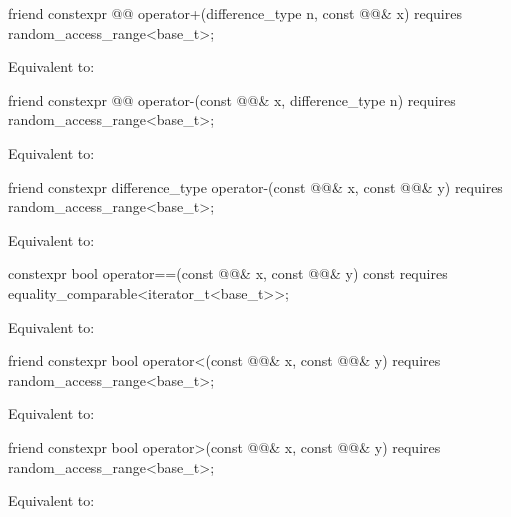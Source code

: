 \begin{itemdecl}
friend constexpr @@ operator+(difference_type n, const @@& x)
  requires random_access_range<base_t>;
\end{itemdecl}
\begin{itemdescr}
	\pnum
	\effects Equivalent to: 
\end{itemdescr}

\begin{itemdecl}
friend constexpr @@ operator-(const @@& x, difference_type n)
  requires random_access_range<base_t>;
\end{itemdecl}
\begin{itemdescr}
	\pnum
	\effects Equivalent to: 
\end{itemdescr}

\begin{itemdecl}
friend constexpr difference_type operator-(const @@& x, const @@& y)
  requires random_access_range<base_t>;
\end{itemdecl}
\begin{itemdescr}
	\pnum
	\effects Equivalent to: 
\end{itemdescr}

\begin{itemdecl}
constexpr bool operator==(const @@& x, const @@& y) const
  requires equality_comparable<iterator_t<base_t>>;
\end{itemdecl}
\begin{itemdescr}
	\pnum
	\effects Equivalent to: 
\end{itemdescr}

\begin{itemdecl}
friend constexpr bool operator<(const @@& x, const @@& y)
  requires random_access_range<base_t>;
\end{itemdecl}
\begin{itemdescr}
	\pnum
	\effects Equivalent to: 
\end{itemdescr}

\begin{itemdecl}
friend constexpr bool operator>(const @@& x, const @@& y)
  requires random_access_range<base_t>;
\end{itemdecl}
\begin{itemdescr}
	\pnum
	\effects Equivalent to: 
\end{itemdescr}

